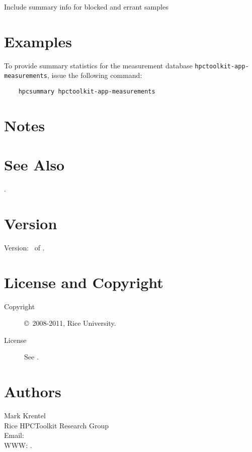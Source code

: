 \documentclass[english]{article}
\begin{document}
\begin{Description}

\item[\Opt{--all}]
Include summary info for blocked and errant samples

\end{Description}


\section{Examples}

To provide summary statistics for the measurement database \texttt{hpctoolkit-app-measurements}, issue the following command:
\begin{verbatim}
    hpcsummary hpctoolkit-app-measurements
\end{verbatim}


\section{Notes}


\section{See Also}

.

\section{Version}

Version: \Version\ of \Date.

\section{License and Copyright}

\begin{description}
\item[Copyright] \copyright\ 2008-2011, Rice University.
\item[License] See .
\end{description}

\section{Authors}

\noindent
Mark Krentel \\
Rice HPCToolkit Research Group \\
Email:  \\
WWW: .

\LatexManEnd
\end{document}
